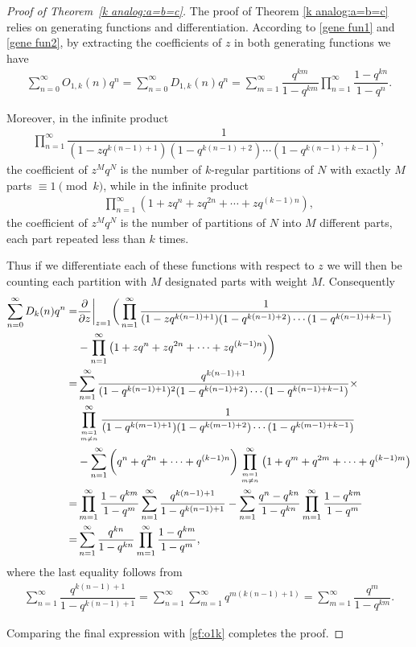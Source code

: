 \documentclass[12pt]{amsart}
\numberwithin{equation}{section}
\theoremstyle{plain}
\theoremstyle{definition}
\begin{document}
\begin{proof}[Proof of Theorem~\ref{k analog:a=b=c}]
The proof of Theorem \ref{k analog:a=b=c} relies on generating functions and differentiation. According to \eqref{gene fun1} and \eqref{gene fun2}, by extracting the coefficients of $z$ in both generating functions we have
\begin{align}\label{gf:o1k}
\sum_{n=0}^{\infty}O_{1,k}(n)q^{n}=\sum_{n=0}^{\infty}D_{1,k}(n)q^{n}=\sum_{m=1}^{\infty}\dfrac{q^{km}}{1-q^{km}}\prod_{n=1}^{\infty}\dfrac{1-q^{kn}}{1-q^{n}}.
\end{align}

Moreover, in the infinite product
\begin{align*}
\prod_{n=1}^{\infty}\dfrac{1}{(1-zq^{k(n-1)+1})(1-q^{k(n-1)+2})\cdots(1-q^{k(n-1)+k-1})},
\end{align*}
the coefficient of $z^{M}q^{N}$ is the number of $k$-regular partitions of $N$ with exactly $M$ parts $\equiv1\pmod{k}$, while in the infinite product
\begin{align*}
\prod_{n=1}^{\infty}\left(1+zq^{n}+zq^{2n}+\cdots+zq^{(k-1)n}\right),
\end{align*}
the coefficient of $z^{M}q^{N}$ is the number of partitions of $N$ into $M$ different parts, each part repeated less than $k$ times.

Thus if we differentiate each of these functions with respect to $z$ we will then be counting each partition with $M$ designated parts with weight $M$. Consequently
\begin{align*}
\sum_{n=0}^{\infty}D_k(n)q^{n}
 =&\dfrac{\partial}{\partial z}\bigg|_{z=1}\bigg(\prod_{n=1}^{\infty}\dfrac{1}{(1-zq^{k(n-1)+1})(1-q^{k(n-1)+2})\cdots(1-q^{k(n-1)+k-1})} \\
 & -\prod_{n=1}^{\infty}\big(1+zq^{n}+zq^{2n}+\cdots+zq^{(k-1)n}\big)\bigg)\\
 =&\sum_{n=1}^{\infty}\dfrac{q^{k(n-1)+1}}{(1-q^{k(n-1)+1})^{2}(1-q^{k(n-1)+2})\cdots(1-q^{k(n-1)+k-1})}\times\\
 &\prod_{m=1\atop m\neq n}^{\infty}\dfrac{1}{(1-q^{k(m-1)+1})(1-q^{k(m-1)+2})\cdots(1-q^{k(m-1)+k-1})}\\
 &-\sum_{n=1}^{\infty}\bigg(q^{n}+q^{2n}+\cdots+q^{(k-1)n}\bigg)\prod_{m=1\atop m\neq n}^{\infty}\big(1+q^{m}+q^{2m}+\cdots+q^{(k-1)m}\big)\\
 =&\prod_{m=1}^{\infty}\dfrac{1-q^{km}}{1-q^{m}}\sum_{n=1}^{\infty}\dfrac{q^{k(n-1)+1}}{1-q^{k(n-1)+1}}-\sum_{n=1}^{\infty}\dfrac{q^{n}-q^{kn}}{1-q^{kn}}\prod_{m=1}^{\infty}\dfrac{1-q^{km}}{1-q^{m}}\\
 =&\sum_{n=1}^{\infty}\dfrac{q^{kn}}{1-q^{kn}}\prod_{m=1}^{\infty}\dfrac{1-q^{km}}{1-q^{m}},
\end{align*}
where the last equality follows from
\begin{align*}
\sum_{n=1}^{\infty}\dfrac{q^{k(n-1)+1}}{1-q^{k(n-1)+1}}=\sum_{n=1}^{\infty}\sum_{m=1}^{\infty}q^{m(k(n-1)+1)}=\sum_{m=1}^{\infty}\dfrac{q^{m}}{1-q^{km}}.
\end{align*}

Comparing the final expression with \eqref{gf:o1k} completes the proof.
\end{proof}
\end{document}
